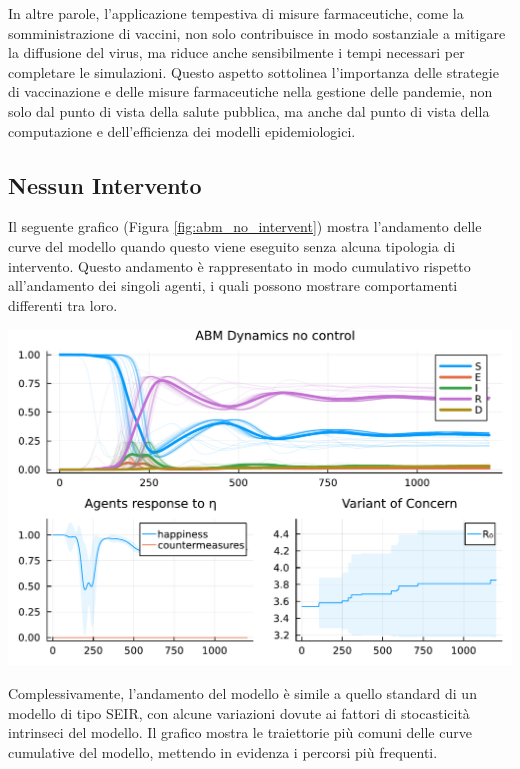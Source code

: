 In altre parole, l'applicazione tempestiva di misure farmaceutiche, 
come la somministrazione di vaccini, non solo contribuisce in modo 
sostanziale a mitigare la diffusione del virus, ma riduce anche 
sensibilmente i tempi necessari per completare le simulazioni. 
Questo aspetto sottolinea l'importanza delle strategie di vaccinazione 
e delle misure farmaceutiche nella gestione delle pandemie, 
non solo dal punto di vista della salute pubblica, ma anche dal punto 
di vista della computazione e dell'efficienza dei modelli epidemiologici.
\newpage

\subsection{Nessun Intervento}

Il seguente grafico (Figura \ref{fig:abm_no_intervent}) mostra 
l'andamento delle curve del modello quando questo viene eseguito 
senza alcuna tipologia di intervento. Questo andamento è rappresentato 
in modo cumulativo rispetto all'andamento dei singoli agenti, 
i quali possono mostrare comportamenti differenti tra loro.

\begin{minipage}{\linewidth}
    \centering
    \includegraphics[width=\textwidth]{img/SocialNetworkABM_NO_CONTROL.pdf}
    \label{fig:abm_no_intervent}
\end{minipage}

Complessivamente, l'andamento del modello è simile a quello 
standard di un modello di tipo SEIR, con alcune variazioni 
dovute ai fattori di stocasticità intrinseci del modello. 
Il grafico mostra le traiettorie più comuni delle curve cumulative 
del modello, mettendo in evidenza i percorsi più frequenti.

